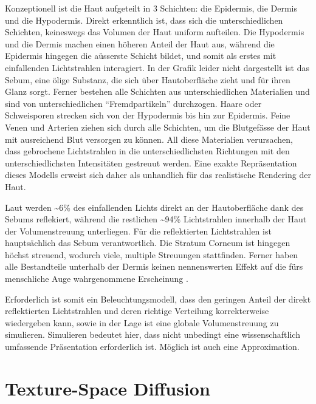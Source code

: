 \documentclass[ngerman,runningheads,a4paper]{llncs}[2018/03/10]
\begin{document}
Konzeptionell ist die Haut aufgeteilt in 3 Schichten: die Epidermis, die Dermis und die Hypodermis.
Direkt erkenntlich ist, dass sich die unterschiedlichen Schichten, keineswegs das Volumen der Haut uniform aufteilen.
Die Hypodermis und die Dermis machen einen höheren Anteil der Haut aus, während die Epidermis hingegen die aüsserste Schicht bildet, und somit als erstes mit einfallenden Lichtstrahlen interagiert.
In der Grafik leider nicht dargestellt ist das Sebum, eine ölige Substanz, die sich über Hautoberfläche zieht und für ihren Glanz sorgt.
Ferner bestehen alle Schichten aus unterschiedlichen Materialien und sind von unterschiedlichen \enquote{Fremdpartikeln} durchzogen.
Haare oder Schweisporen strecken sich von der Hypodermis bis hin zur Epidermis.
Feine Venen und Arterien ziehen sich durch alle Schichten, um die Blutgefässe der Haut mit ausreichend Blut versorgen zu können.
All diese Materialien verursachen, dass gebrochene Lichtstrahlen in die unterschiedlichsten Richtungen mit den unterschiedlichsten Intensitäten gestreuut werden.
Eine exakte Repräsentation dieses Modells erweist sich daher als unhandlich für das realistische Rendering der Haut.

Laut \citet{tuchin2015tissue} werden \textasciitilde{}6\% des einfallenden Lichts direkt an der Hautoberfläche dank des Sebums reflekiert, während die restlichen \textasciitilde{}94\% Lichtstrahlen innerhalb der Haut der Volumenstreuung unterliegen.
Für die reflektierten Lichtstrahlen ist hauptsächlich das Sebum verantwortlich.
Die Stratum Corneum ist hingegen höchst streuend, wodurch viele, multiple Streuungen stattfinden.
Ferner haben alle Bestandteile unterhalb der Dermis keinen nennenswerten Effekt auf die fürs menschliche Auge wahrgenommene Erscheinung \cite{tuchin2015tissue}.

Erforderlich ist somit ein Beleuchtungsmodell, dass den geringen Anteil der direkt reflektierten Lichtstrahlen und deren richtige Verteilung korrekterweise wiedergeben kann, sowie in der Lage ist eine globale Volumenstreuung zu simulieren.
Simulieren bedeutet hier, dass nicht unbedingt eine wissenschaftlich umfassende Präsentation erforderlich ist.
Möglich ist auch eine Approximation.

\section{Texture-Space Diffusion}
\label{sec:texture-space}
\end{document}

